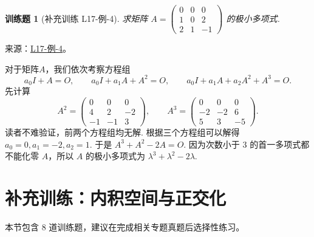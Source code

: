 \documentclass[12pt,fontset=fandol]{ctexart}
\newtheorem{exercise}{训练题}[section]
\begin{document}
\begin{exercise}[补充训练 L17-例-4]\label{prob:L17-例-4}
求矩阵 $A = \begin{pmatrix}
            0 & 0 & 0 \\ 1 & 0 & 2 \\ 2 & 1 & -1
        \end{pmatrix}$ 的极小多项式.
\end{exercise}
\noindent 来源：\href{https://github.com/yhwu-is/Linear-Algebra-Left-Undone/blob/new/%E8%AE%B2%E4%B9%89/%E4%B8%93%E9%A2%98/17%20%E5%A4%9A%E9%A1%B9%E5%BC%8F%E7%9A%84%E8%BF%9B%E4%B8%80%E6%AD%A5%E8%AE%A8%E8%AE%BA.tex}{L17-例-4}。
\begin{solve}
对于矩阵$A$，我们依次考察方程组
    \[
        a_0I+A=O,\qquad a_0I+a_1A+A^2=O,\qquad a_0I+a_1A+a_2A^2+A^3=O.
    \]
    先计算
    \[
        A^2=\begin{pmatrix}
                0 & 0  & 0  \\
                4 & 2  & -2 \\
                -1 & -1 & 3
            \end{pmatrix},
        \qquad
        A^3=\begin{pmatrix}
                0 & 0  & 0  \\
                -2 & -2 & 6  \\
                5 & 3  & -5
            \end{pmatrix}.
    \]
    读者不难验证，前两个方程组均无解. 根据三个方程组可以解得 $a_0 = 0, a_1 = -2, a_2 = 1$. 于是 $A^3 + A^2 - 2A=O$. 因为次数小于 $3$ 的首一多项式都不能化零 $A$，所以 $A$ 的极小多项式为 $\lambda^3+\lambda^2-2\lambda$.
\end{solve}

\section{补充训练：内积空间与正交化}

本节包含 8 道训练题，建议在完成相关专题真题后选择性练习。
\end{document}

